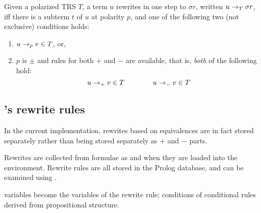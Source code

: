 \begin{defn}
\label{def:poltr}
Given a polarized TRS $T$, a term $u$ rewrites in one step
to $\sigma r$, written $u\rightarrow_T \sigma r$, iff there is a
subterm $t$ of $u$ at polarity $p$, and one of the
following two (not exclusive) conditions holds:

\begin{enumerate}
\item $u\rightarrow_p v\in T$, or, 
\item $p$ is $\pm$ and rules for both $+$ and $-$ are available, that
is, {\em both\/} of the following hold:
\[u\rightarrow_+ v\in T \qquad\qquad u\rightarrow_- v\in T
\]
\end{enumerate}
\end{defn}

\subsection {\clam's rewrite rules}
In the current \clam{} implementation, rewrites based on equivalences 
are in fact stored separately rather than being stored separately as
$+$ and $-$ parts.

Rewrites are collected from formulae as and when they are loaded into
the environment.  Rewrite rules are all stored in the Prolog database, 
and can be examined using .


variables become the variables of the rewrite rule; conditions of
conditional rules derived from propositional structure.  


